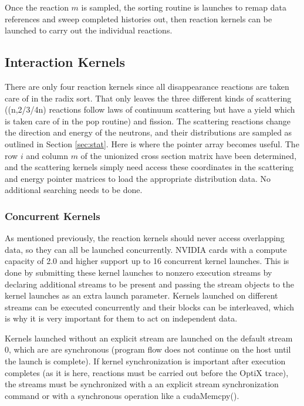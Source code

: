 Once the reaction $m$ is sampled, the sorting routine is launches to remap data references and sweep completed histories out, then reaction kernels can be launched to carry out the individual reactions.

\subsection{Interaction Kernels}

There are only four reaction kernels since all disappearance reactions are taken care of in the radix sort.  That only leaves the three different kinds of scattering ((n,2/3/4n) reactions follow laws of continuum scattering but have a yield which is taken care of in the pop routine) and fission.  The scattering reactions change the direction and energy of the neutrons, and their distributions are sampled as outlined in Section \ref{sec:stat}.  Here is where the pointer array becomes useful.  The row $i$ and column $m$ of the unionized cross section matrix have been determined, and the scattering kernels simply need access these coordinates in the scattering and energy pointer matrices to load the appropriate distribution data.  No additional searching needs to be done.

\subsubsection{Concurrent Kernels}

As mentioned previously, the reaction kernels should never access overlapping data, so they can all be launched concurrently.  NVIDIA cards with a compute capacity of 2.0 and higher support up to 16 concurrent kernel launches.  This is done by submitting these kernel launches to nonzero execution streams by declaring additional streams to be present and passing the stream objects to the kernel launches as an extra launch parameter.  Kernels launched on different streams can be executed concurrently and their blocks can be interleaved, which is why it is very important for them to act on independent data.

Kernels launched without an explicit stream are launched on the default stream 0, which are are synchronous (program flow does not continue on the host until the launch is complete).  If kernel synchronization is important after execution completes (as it is here, reactions must be carried out before the OptiX trace), the streams must be synchronized with a an explicit stream synchronization command or with a synchronous operation like a cudaMemcpy().

